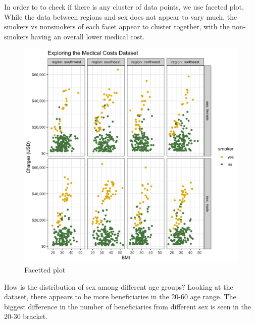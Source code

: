 \documentclass[
]{article}
\begin{document}
In order to to check if there is any cluster of data points, we use
faceted plot. While the data between regions and sex does not appear to
vary much, the smokers vs nonsmokers of each facet appear to cluster
together, with the non-smokers having an overall lower medical cost.

\begin{figure}
\centering
\includegraphics{../images/facet.png}
\caption{Facetted plot}
\end{figure}

How is the distribution of sex among different age groups? Looking at
the dataset, there appears to be more beneficiaries in the 20-60 age
range. The biggest difference in the number of beneficiaries from
different sex is seen in the 20-30 bracket.
\end{document}
